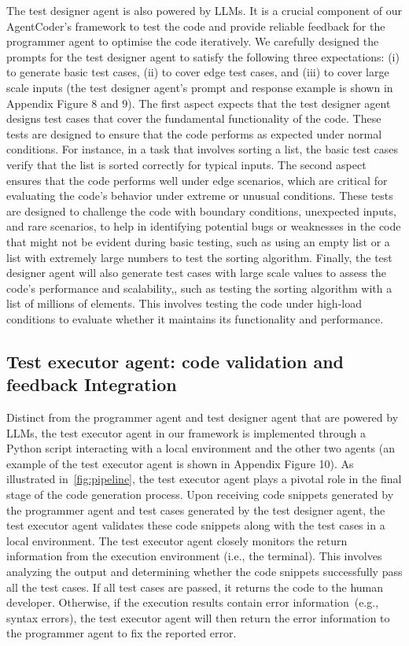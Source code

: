 \documentclass[manuscript,screen,review]{acmart}
\newcommand{\xxx}{AgentCoder\xspace}
\begin{document}
The test designer agent is also powered by LLMs. It is a crucial component of our \xxx's framework to test the code and provide reliable feedback for the programmer agent to optimise the code iteratively.   
We carefully designed the prompts for the test designer agent to satisfy the following three expectations:
(i) to generate basic test cases, (ii) to cover edge test cases, and (iii) to cover large scale inputs (the test designer agent's prompt and response example is shown in Appendix Figure 8 and 9).
The first aspect expects that the test designer agent designs test cases that cover the fundamental functionality of the code. These tests are designed to ensure that the code performs as expected under normal conditions. For instance, in a task that involves sorting a list, the basic test cases  verify that the list is sorted correctly for typical inputs. 
The second aspect ensures that the code performs well under edge scenarios, which are critical for evaluating the code’s behavior under extreme or unusual conditions. 
These tests are designed to challenge the code with boundary conditions, unexpected inputs, and rare scenarios, to help in identifying potential bugs or weaknesses in the code that might not be evident during basic testing, such as using an empty list or a list with extremely large numbers to test the sorting algorithm.  
Finally, the test designer agent will also generate test cases with large scale values to assess the code’s performance and scalability,, such as testing the sorting algorithm with a list of millions of elements. This involves testing the code under high-load conditions to evaluate whether it maintains its functionality and performance. 


\subsection{Test executor agent: code validation and feedback Integration}

Distinct from the programmer agent and test designer agent that are powered by LLMs, the test executor agent in our framework is implemented through a Python script interacting with a local environment and the other two agents (an example of the test executor agent is shown in Appendix Figure 10). As illustrated in~\cref{fig:pipeline}, the test executor agent plays a pivotal role in the final stage of the code generation process. Upon receiving code snippets generated by the programmer agent and test cases generated by the test designer agent, the test executor agent validates these code snippets along with the test cases in a local environment. 
The test executor agent closely monitors the return information from the execution environment (i.e., the terminal). This involves analyzing the output and determining whether the code snippets successfully pass all the test cases. If all test cases are passed, it returns the code to the human developer. Otherwise, if the execution results contain error information~(e.g., syntax errors), the test executor agent will then return the error information to the programmer agent to fix the reported error. 
\end{document}
